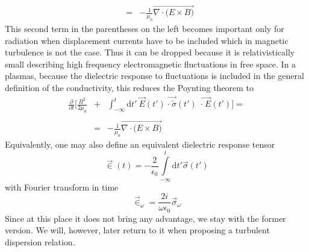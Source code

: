 \documentclass[ ]{copernicus2}
\begin{document}
{\begin{eqnarray}
&&\\[-1.5ex]
&=&-\frac{1}{\mu_0}\vec{\nabla\cdot\Big(E\times B\Big)}\nonumber
\end{eqnarray}
{This second term in the parentheses on the left} becomes important only for radiation when displacement currents have to be included which in magnetic turbulence is not the case. Thus it can be dropped because it is relativistically small describing high frequency electromagnetic fluctuations in free space. {In a plasmas, because the dielectric response to fluctuations is included in the general definition of the conductivity, this reduces} the Poynting theorem to
\begin{eqnarray}
\frac{\partial}{\partial t}\bigg[\frac{B^2}{2\mu_0}&+&\!\!\!\!\int_{-\infty}^t\!\!\!\!\!\!\!\!\!\!\!\!\mathrm{d}t'\ \vec{E}(t')\ \vec{\cdot\ \tilde{\sigma}} (t')\:\:\vec{\cdot\  E}(t') \bigg]\!= \nonumber\\[-1.5ex]
&&\\[-1.5ex]
&=&-\frac{1}{\mu_0}\vec{\nabla\cdot\Big(E\times B\Big)}\nonumber
\end{eqnarray}
Equivalently, one may also define an equivalent dielectric response tensor 
\begin{equation}
\vec{\in}(t)=-\frac{2}{\epsilon_0}\int\limits_{-\infty}^t\mathrm{d}t'\vec{\sigma}(t')
\end{equation}
with Fourier transform in time
\begin{equation}\label{eq-epsilon}
\vec{\in}_\omega=\frac{2i}{\omega\epsilon_0}\vec{\sigma}_\omega
\end{equation}
Since at this place it does not bring any advantage, we stay with the former version. {We will, however, later return to it when proposing  a turbulent dispersion relation.}

}
\end{document}

